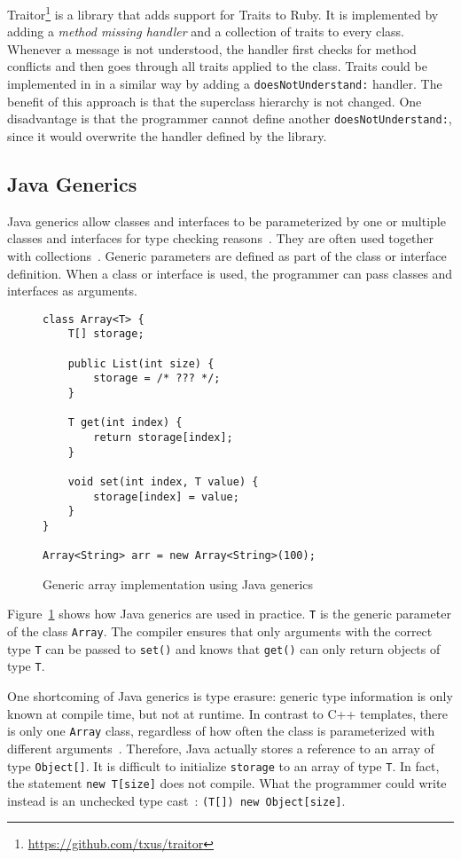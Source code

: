 Traitor\footnote{\url{https://github.com/txus/traitor}} is a library that adds support for Traits to Ruby. It is implemented by adding a \emph{method missing handler} and a collection of traits to every class. Whenever a message is not understood, the handler first checks for method conflicts and then goes through all traits applied to the class. Traits could be implemented in \msname in a similar way by adding a \texttt{doesNotUnderstand:} handler. The benefit of this approach is that the superclass hierarchy is not changed. One disadvantage is that the programmer cannot define another \texttt{doesNotUnderstand:}, since it would overwrite the handler defined by the library.

\subsection{Java Generics}
Java generics allow classes and interfaces to be parameterized by one or multiple classes and interfaces for type checking reasons~\cite{bracha2004generics, Bracha03addinggenerics}. They are often used together with collections~\cite{Parnin:2011:JGA:1985441.1985446}. Generic parameters are defined as part of the class or interface definition. When a class or interface is used, the programmer can pass classes and interfaces as arguments.

\begin{figure}[!htp]
\begin{lstlisting}
class Array<T> {
    T[] storage;

    public List(int size) {
        storage = /* ??? */;
    }

    T get(int index) {
        return storage[index];
    }

    void set(int index, T value) {
        storage[index] = value;
    }
}

Array<String> arr = new Array<String>(100);
\end{lstlisting}
\caption{Generic array implementation using Java generics}
\label{fig:rel_java_generics}
\end{figure}

Figure~\ref{fig:rel_java_generics} shows how Java generics are used in practice. \texttt{T} is the generic parameter of the class \texttt{Array}. The compiler ensures that only arguments with the correct type \texttt{T} can be passed to \texttt{set()} and knows that \texttt{get()} can only return objects of type \texttt{T}. 

One shortcoming of Java generics is type erasure: generic type information is only known at compile time, but not at runtime. In contrast to C++ templates, there is only one \texttt{Array} class, regardless of how often the class is parameterized with different arguments~\cite{lembcke2006specialization}. Therefore, Java actually stores a reference to an array of type \texttt{Object[]}. It is difficult to initialize \texttt{storage} to an array of type \texttt{T}. In fact, the statement \texttt{new T[size]} does not compile. What the programmer could write instead is an unchecked type cast~\cite{nino2007cost}: \texttt{(T[]) new Object[size]}.

